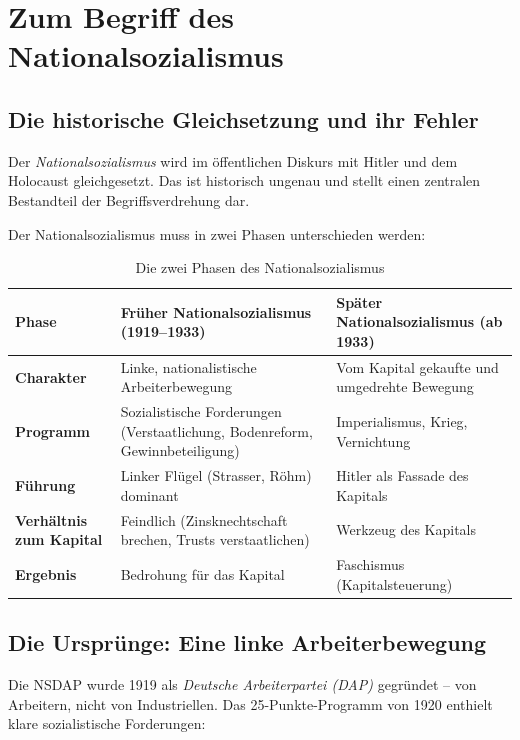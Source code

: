 \section{Zum Begriff des Nationalsozialismus}

\subsection{Die historische Gleichsetzung und ihr Fehler}

Der \emph{Nationalsozialismus} wird im öffentlichen Diskurs mit Hitler und dem Holocaust gleichgesetzt. Das ist historisch ungenau und stellt einen zentralen Bestandteil der Begriffsverdrehung dar.

Der Nationalsozialismus muss in zwei Phasen unterschieden werden:

\begin{table}[h]
\centering
\begin{tabular}{|p{}|p{}|p{}|}
\hline
\textbf{Phase} & \textbf{Früher Nationalsozialismus (1919--1933)} & \textbf{Später Nationalsozialismus (ab 1933)} \\
\hline
\textbf{Charakter} & Linke, nationalistische Arbeiterbewegung & Vom Kapital gekaufte und umgedrehte Bewegung \\
\hline
\textbf{Programm} & Sozialistische Forderungen (Verstaatlichung, Bodenreform, Gewinnbeteiligung) & Imperialismus, Krieg, Vernichtung \\
\hline
\textbf{Führung} & Linker Flügel (Strasser, Röhm) dominant & Hitler als Fassade des Kapitals \\
\hline
\textbf{Verhältnis zum Kapital} & Feindlich (Zinsknechtschaft brechen, Trusts verstaatlichen) & Werkzeug des Kapitals \\
\hline
\textbf{Ergebnis} & Bedrohung für das Kapital & Faschismus (Kapitalsteuerung) \\
\hline
\end{tabular}
\caption{Die zwei Phasen des Nationalsozialismus}
\end{table}

\subsection{Die Ursprünge: Eine linke Arbeiterbewegung}

Die NSDAP wurde 1919 als \emph{Deutsche Arbeiterpartei (DAP)} gegründet – von Arbeitern, nicht von Industriellen. Das 25-Punkte-Programm von 1920 enthielt klare sozialistische Forderungen:

